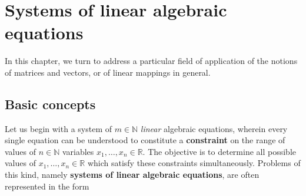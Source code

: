 \chapter[Systems of linear algebraic equations]{Systems of linear 
algebraic equations}

\vspace{10mm}
\noindent
In this chapter, we turn to address a particular field of 
application of the notions of matrices and vectors, or of linear 
mappings in general.

\section[Basic concepts]%
{Basic concepts}
Let us begin with a system of $m \in \mathbb{N}$ \emph{linear} 
algebraic equations, wherein every single equation can be 
understood to constitute a {\bf constraint} on the range of values 
of $n \in \mathbb{N}$ variables $x_{1}, %
\ldots, x_{n} \in \mathbb{R}$. The objective is to determine all 
possible values of $x_{1}, \ldots, x_{n} \in \mathbb{R}$ which 
satisfy these constraints simultaneously. Problems of this kind, 
namely {\bf systems of linear algebraic equations}, are often 
represented in the form

